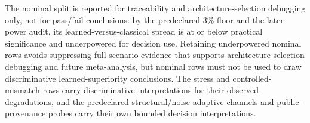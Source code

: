\documentclass{article}
\begin{document}


The nominal split is reported for traceability and architecture-selection debugging only, not for pass/fail conclusions: by the predeclared 3\% floor and the later power audit, its learned-versus-classical spread is at or below practical significance and underpowered for decision use. Retaining underpowered nominal rows avoids suppressing full-scenario evidence that supports architecture-selection debugging and future meta-analysis, but nominal rows must not be used to draw discriminative learned-superiority conclusions. The stress and controlled-mismatch rows carry discriminative interpretations for their observed degradations, and the predeclared structural/noise-adaptive channels and public-provenance probes carry their own bounded decision interpretations.
\end{document}
